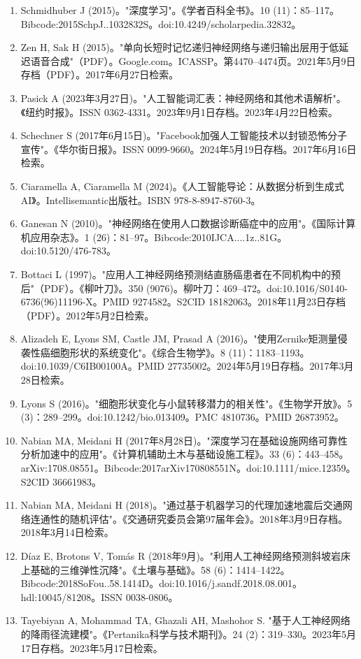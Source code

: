 \begin{enumerate}
\item Schmidhuber J (2015)。"深度学习"。《学者百科全书》。10 (11)：85–117。Bibcode:2015SchpJ..1032832S。doi:10.4249/scholarpedia.32832。
\item Zen H, Sak H (2015)。"单向长短时记忆递归神经网络与递归输出层用于低延迟语音合成"（PDF）。Google.com。ICASSP。第4470–4474页。2021年5月9日存档（PDF）。2017年6月27日检索。
\item Pasick A (2023年3月27日)。"人工智能词汇表：神经网络和其他术语解析"。《纽约时报》。ISSN 0362-4331。2023年9月1日存档。2023年4月22日检索。
\item Schechner S (2017年6月15日)。"Facebook加强人工智能技术以封锁恐怖分子宣传"。《华尔街日报》。ISSN 0099-9660。2024年5月19日存档。2017年6月16日检索。
\item Ciaramella A, Ciaramella M (2024)。《人工智能导论：从数据分析到生成式AI》。Intellisemantic出版社。ISBN 978-8-8947-8760-3。
\item Ganesan N (2010)。"神经网络在使用人口数据诊断癌症中的应用"。《国际计算机应用杂志》。1 (26)：81–97。Bibcode:2010IJCA....1z..81G。doi:10.5120/476-783。
\item Bottaci L (1997)。"应用人工神经网络预测结直肠癌患者在不同机构中的预后"（PDF）。《柳叶刀》。350 (9076)。柳叶刀：469–472。doi:10.1016/S0140-6736(96)11196-X。PMID 9274582。S2CID 18182063。2018年11月23日存档（PDF）。2012年5月2日检索。
\item Alizadeh E, Lyons SM, Castle JM, Prasad A (2016)。"使用Zernike矩测量侵袭性癌细胞形状的系统变化"。《综合生物学》。8 (11)：1183–1193。doi:10.1039/C6IB00100A。PMID 27735002。2024年5月19日存档。2017年3月28日检索。
\item Lyons S (2016)。"细胞形状变化与小鼠转移潜力的相关性"。《生物学开放》。5 (3)：289–299。doi:10.1242/bio.013409。PMC 4810736。PMID 26873952。
\item Nabian MA, Meidani H (2017年8月28日)。"深度学习在基础设施网络可靠性分析加速中的应用"。《计算机辅助土木与基础设施工程》。33 (6)：443–458。arXiv:1708.08551。Bibcode:2017arXiv170808551N。doi:10.1111/mice.12359。S2CID 36661983。
\item Nabian MA, Meidani H (2018)。"通过基于机器学习的代理加速地震后交通网络连通性的随机评估"。《交通研究委员会第97届年会》。2018年3月9日存档。2018年3月14日检索。
\item Díaz E, Brotons V, Tomás R (2018年9月)。"利用人工神经网络预测斜坡岩床上基础的三维弹性沉降"。《土壤与基础》。58 (6)：1414–1422。Bibcode:2018SoFou..58.1414D。doi:10.1016/j.sandf.2018.08.001。hdl:10045/81208。ISSN 0038-0806。
\item Tayebiyan A, Mohammad TA, Ghazali AH, Mashohor S. "基于人工神经网络的降雨径流建模"。《Pertanika科学与技术期刊》。24 (2)：319–330。2023年5月17日存档。2023年5月17日检索。

\end{enumerate}
